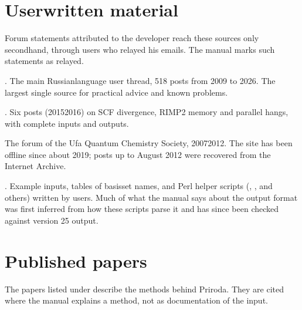 \documentclass[letterpaper,10pt,english,openany,oneside]{sphinxmanual}
\begin{document}
\section{User\sphinxhyphen{}written material}
\label{\detokenize{sources:user-written-material}}
\sphinxAtStartPar
Forum statements attributed to the developer reach these sources only second\sphinxhyphen{}hand, through users who relayed his
e\sphinxhyphen{}mails. The manual marks such statements as relayed.
\begin{description}
\sphinxAtStartPar
{}. The main Russian\sphinxhyphen{}language user thread, 518 posts from
2009 to 2026. The largest single source for practical advice and known problems.

\sphinxAtStartPar
{}. Six posts (2015\textendash{}2016) on SCF divergence, RI\sphinxhyphen{}MP2 memory and
parallel hangs, with complete inputs and outputs.

\sphinxAtStartPar
The forum of the Ufa Quantum Chemistry Society, 2007\textendash{}2012. The site has been offline since about 2019; posts up to
August 2012 were recovered from the Internet Archive.

\sphinxAtStartPar
{}. Example inputs, tables of basis\sphinxhyphen{}set names, and Perl helper scripts
(, ,  and others) written by users. Much of what the manual says about the output format was
first inferred from how these scripts parse it and has since been checked against version 25 output.

\end{description}


\section{Published papers}
\label{\detokenize{sources:published-papers}}
\sphinxAtStartPar
The papers listed under {\hyperref[\detokenize{start/about:how-to-cite}]{}} describe the methods behind Priroda. They are cited where the manual
explains a method, not as documentation of the input.



\renewcommand{\indexname}{Index}
\printindex
\end{document}
